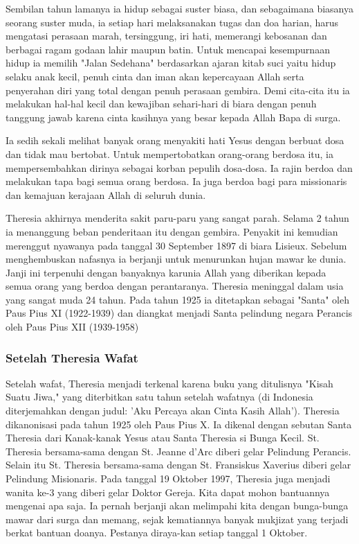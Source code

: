 Sembilan tahun lamanya ia hidup sebagai suster biasa, dan sebagaimana biasanya seorang suster muda, ia setiap hari melaksanakan tugas dan doa harian, harus mengatasi perasaan marah, tersinggung, iri hati, memerangi kebosanan dan berbagai ragam godaan lahir maupun batin. Untuk mencapai kesempurnaan hidup ia memilih "Jalan Sedehana" berdasarkan ajaran kitab suci yaitu hidup selaku anak kecil, penuh cinta dan iman akan kepercayaan Allah serta penyerahan diri yang total dengan penuh perasaan gembira. Demi cita-cita itu ia melakukan hal-hal kecil dan kewajiban sehari-hari di biara dengan penuh tanggung jawab karena cinta kasihnya yang besar kepada Allah Bapa di surga.

Ia sedih sekali melihat banyak orang menyakiti hati Yesus dengan berbuat dosa dan tidak mau bertobat. Untuk mempertobatkan orang-orang berdosa itu, ia mempersembahkan dirinya sebagai korban pepulih dosa-dosa. Ia rajin berdoa dan melakukan tapa bagi semua orang berdosa. Ia juga berdoa bagi para missionaris dan kemajuan kerajaan Allah di seluruh dunia.

Theresia akhirnya menderita sakit paru-paru yang sangat parah. Selama 2 tahun ia menanggung beban penderitaan itu dengan gembira. Penyakit ini kemudian merenggut nyawanya pada tanggal 30 September 1897 di biara Lisieux. Sebelum menghembuskan nafasnya ia berjanji untuk menurunkan hujan mawar ke dunia. Janji ini terpenuhi dengan banyaknya karunia Allah yang diberikan kepada semua orang yang berdoa dengan perantaranya. Theresia meninggal dalam usia yang sangat muda 24 tahun. Pada tahun 1925 ia ditetapkan sebagai "Santa" oleh Paus Pius XI (1922-1939) dan diangkat menjadi Santa pelindung negara Perancis oleh Paus Pius XII (1939-1958)

\subsubsection*{Setelah Theresia Wafat}

Setelah wafat, Theresia menjadi terkenal karena buku yang ditulisnya "Kisah Suatu Jiwa," yang diterbitkan satu tahun setelah wafatnya (di Indonesia diterjemahkan dengan judul: 'Aku Percaya akan Cinta Kasih Allah'). Theresia dikanonisasi pada tahun 1925 oleh Paus Pius X. Ia dikenal dengan sebutan Santa Theresia dari Kanak-kanak Yesus atau Santa Theresia si Bunga Kecil. St. Theresia bersama-sama dengan St. Jeanne d'Arc diberi gelar Pelindung Perancis. Selain itu St. Theresia bersama-sama dengan St. Fransiskus Xaverius diberi gelar Pelindung Misionaris.  Pada tanggal 19 Oktober 1997, Theresia juga menjadi wanita ke-3 yang diberi gelar Doktor Gereja. Kita dapat mohon bantuannya mengenai apa saja. Ia pernah berjanji  akan melimpahi kita dengan bunga-bunga mawar dari surga dan memang, sejak kematiannya banyak mukjizat yang terjadi berkat bantuan doanya. Pestanya diraya-kan setiap tanggal 1 Oktober.

